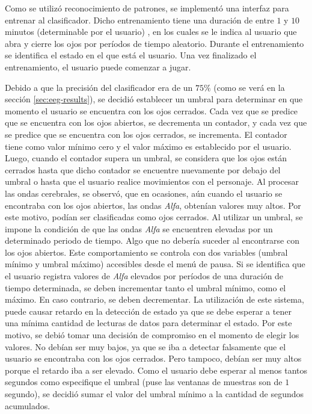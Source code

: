 Como se utilizó reconocimiento de patrones, se implementó una interfaz para entrenar al clasificador. Dicho entrenamiento tiene una duración de entre $1$ y $10$ minutos (determinable por el usuario) , en los cuales se le indica al usuario que abra y cierre los ojos por períodos de tiempo aleatorio. Durante el entrenamiento se identifica el estado en el que está el usuario. Una vez finalizado el entrenamiento, el usuario puede comenzar a jugar.

Debido a que la precisión del clasificador era de un  $75\%$ (como se verá en la sección \ref{sec:eeg-results}), se decidió establecer un umbral para determinar en que momento el usuario se encuentra con los ojos cerrados. Cada vez que se predice que se encuentra con los ojos abiertos, se decrementa un contador, y cada vez que se predice que se encuentra con los ojos cerrados, se incrementa. El contador tiene como valor mínimo cero y el valor máximo es establecido por el usuario.  Luego, cuando el contador supera un umbral, se considera que los ojos están cerrados hasta que dicho contador se encuentre nuevamente por debajo del umbral o hasta que el usuario realice movimientos con el personaje. Al procesar las ondas cerebrales, se observó, que en ocasiones, aún cuando el usuario se encontraba con los ojos abiertos, las ondas \emph{Alfa}, obtenían valores muy altos. Por este motivo, podían ser clasificadas como ojos cerrados. Al utilizar un umbral, se impone la condición de que las ondas  \emph{Alfa} se encuentren elevadas por un determinado periodo de tiempo. Algo que no debería suceder al encontrarse con los ojos abiertos. Este comportamiento se controla con dos variables (umbral mínimo y umbral máximo) accesibles desde el menú de pausa. Si se identifica que el usuario registra valores de \emph{Alfa} elevados por períodos de una duración de tiempo determinada, se deben incrementar  tanto el umbral mínimo, como el máximo. En caso contrario, se deben decrementar. La utilización de este sistema, puede causar retardo en la detección de estado ya que se debe esperar a tener una mínima cantidad de lecturas de datos para determinar el estado. Por este motivo, se debió tomar una decisión de compromiso en el momento de elegir los valores. No debían ser muy bajos, ya que se iba a detectar falsamente que el usuario se encontraba con los ojos cerrados. Pero tampoco, debían ser muy altos porque el retardo iba a ser elevado. Como el usuario debe esperar al menos tantos segundos como especifique el umbral (puse las ventanas de muestras son de $1$ segundo), se decidió sumar el valor del umbral mínimo a la cantidad de segundos acumulados.

